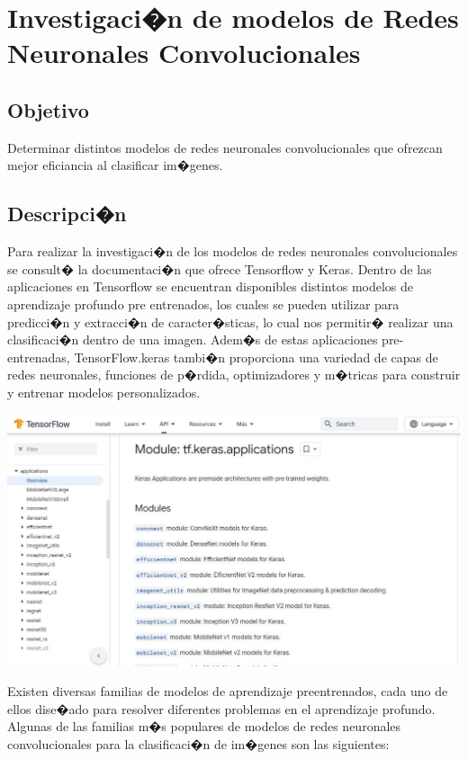 \documentclass[12pt,letterpaper]{article}
\begin{document}
\newpage
\section{Investigaci�n de modelos de Redes Neuronales Convolucionales}


\subsection{Objetivo}
Determinar distintos modelos de redes neuronales convolucionales que ofrezcan mejor eficiancia al clasificar im�genes.

\subsection{Descripci�n}
Para realizar la investigaci�n de los modelos de redes neuronales convolucionales se consult� la documentaci�n que ofrece Tensorflow y Keras. Dentro de las aplicaciones en Tensorflow se encuentran disponibles distintos modelos de aprendizaje profundo pre entrenados, los cuales se pueden utilizar para predicci�n y extracci�n de caracter�sticas, lo cual nos permitir� realizar una clasificaci�n dentro de una imagen. Adem�s de estas aplicaciones pre-entrenadas, TensorFlow.keras tambi�n proporciona una variedad de capas de redes neuronales, funciones de p�rdida, optimizadores y m�tricas para construir y entrenar modelos personalizados. 

\begin{center}
  \includegraphics[scale=0.5]{imagenes/tf}
 \label{fig:AppsKeras} 
\end{center} 

Existen diversas familias de modelos de aprendizaje preentrenados, cada uno de ellos dise�ado para resolver diferentes problemas en el aprendizaje profundo. Algunas de las familias m�s populares de modelos de redes neuronales convolucionales para la clasificaci�n de im�genes son las siguientes:
\end{document}
